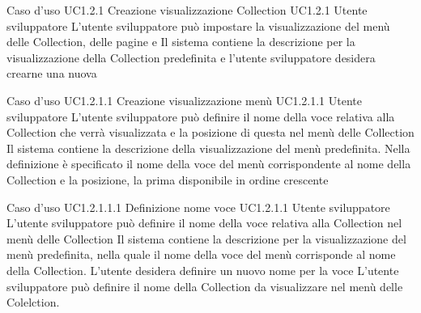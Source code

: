 \UCtitle
{Caso d'uso UC1.2.1}
{Creazione visualizzazione Collection}
\UC
{UC1.2.1}
{Utente sviluppatore}
{L'utente sviluppatore  può impostare la visualizzazione del menù delle Collection, delle pagine  e }
{Il sistema contiene la descrizione per la visualizzazione della Collection predefinita e l'utente sviluppatore desidera crearne una nuova}

\UCtitle
{Caso d'uso UC1.2.1.1}
{Creazione visualizzazione menù}
\UC
{UC1.2.1.1}
{Utente sviluppatore}
{L'utente sviluppatore può definire il nome della voce relativa alla Collection che verrà visualizzata e la posizione di questa nel menù delle Collection}
{Il sistema contiene la descrizione della visualizzazione del menù predefinita. Nella definizione è specificato il nome della voce del menù corrispondente al nome della Collection e la posizione, la prima disponibile in ordine crescente}

\UCtitle
{Caso d'uso UC1.2.1.1.1}
{Definizione nome voce}
\UC
{UC1.2.1.1}
{Utente sviluppatore}
{L'utente sviluppatore può definire il nome della voce relativa alla Collection nel menù delle Collection}
{Il sistema contiene la descrizione per la visualizzazione del menù predefinita, nella quale il nome della voce del menù corrisponde al nome della Collection. L'utente desidera definire un nuovo nome per la voce}
\scenario
{L'utente sviluppatore può definire il nome della Collection da visualizzare nel menù delle Colelction.}

